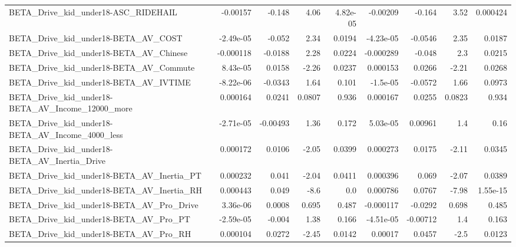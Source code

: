 \begin{tabular}{lrrrrrrrr}
BETA\_Drive\_kid\_under18-ASC\_RIDEHAIL                &    -0.00157 &       -0.148 &     4.06 & 4.82e-05 &   -0.00209 &      -0.164 &         3.52 &      0.000424 \\
BETA\_Drive\_kid\_under18-BETA\_AV\_COST                &   -2.49e-05 &       -0.052 &     2.34 &   0.0194 &  -4.23e-05 &     -0.0546 &         2.35 &        0.0187 \\
BETA\_Drive\_kid\_under18-BETA\_AV\_Chinese             &   -0.000118 &      -0.0188 &     2.28 &   0.0224 &  -0.000289 &      -0.048 &          2.3 &        0.0215 \\
BETA\_Drive\_kid\_under18-BETA\_AV\_Commute             &    8.43e-05 &       0.0158 &    -2.26 &   0.0237 &   0.000153 &      0.0266 &        -2.21 &        0.0268 \\
BETA\_Drive\_kid\_under18-BETA\_AV\_IVTIME              &   -8.22e-06 &      -0.0343 &     1.64 &    0.101 &   -1.5e-05 &     -0.0572 &         1.66 &        0.0973 \\
BETA\_Drive\_kid\_under18-BETA\_AV\_Income\_12000\_more   &    0.000164 &       0.0241 &   0.0807 &    0.936 &   0.000167 &      0.0255 &       0.0823 &         0.934 \\
BETA\_Drive\_kid\_under18-BETA\_AV\_Income\_4000\_less    &   -2.71e-05 &     -0.00493 &     1.36 &    0.172 &   5.03e-05 &     0.00961 &          1.4 &          0.16 \\
BETA\_Drive\_kid\_under18-BETA\_AV\_Inertia\_Drive       &    0.000172 &       0.0106 &    -2.05 &   0.0399 &   0.000273 &      0.0175 &        -2.11 &        0.0345 \\
BETA\_Drive\_kid\_under18-BETA\_AV\_Inertia\_PT          &    0.000232 &        0.041 &    -2.04 &   0.0411 &   0.000396 &       0.069 &        -2.07 &        0.0389 \\
BETA\_Drive\_kid\_under18-BETA\_AV\_Inertia\_RH          &    0.000443 &        0.049 &     -8.6 &      0.0 &   0.000786 &      0.0767 &        -7.98 &      1.55e-15 \\
BETA\_Drive\_kid\_under18-BETA\_AV\_Pro\_Drive           &    3.36e-06 &       0.0008 &    0.695 &    0.487 &  -0.000117 &     -0.0292 &        0.698 &         0.485 \\
BETA\_Drive\_kid\_under18-BETA\_AV\_Pro\_PT              &   -2.59e-05 &       -0.004 &     1.38 &    0.166 &  -4.51e-05 &    -0.00712 &          1.4 &         0.163 \\
BETA\_Drive\_kid\_under18-BETA\_AV\_Pro\_RH              &    0.000104 &       0.0272 &    -2.45 &   0.0142 &    0.00017 &      0.0457 &         -2.5 &        0.0123 \\

\end{tabular}

